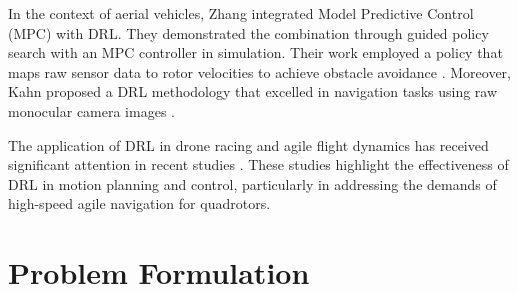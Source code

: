 \documentclass[letterpaper,journal,twoside]{IEEEtran}
\begin{document}
In the context of aerial vehicles, Zhang \etal integrated Model Predictive Control (MPC) with DRL. 
They demonstrated the combination through guided policy search 
with an MPC controller in simulation. 
Their work employed a policy that maps raw sensor data to rotor 
velocities to achieve obstacle avoidance \cite{zhang2016learning}. 
Moreover, Kahn \etal proposed a DRL methodology that excelled in 
navigation tasks using raw monocular camera images \cite{kahn2018self}.

The application of DRL in drone racing and agile flight dynamics 
has received significant attention in recent studies \cite{loquercio2019deep, song2021autonomous, song2022policy, penicka2022learning, song2023reaching}. 
These studies highlight the effectiveness of DRL in motion 
planning and control, particularly in addressing the demands of 
high-speed agile navigation for quadrotors.


\section{Problem Formulation}
\end{document}
